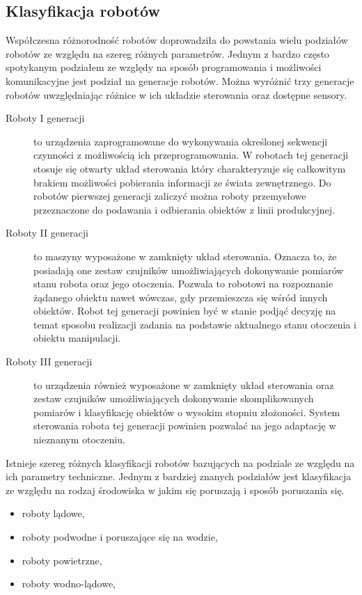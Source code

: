 \subsection{Klasyfikacja robotów}
Współczesna różnorodność robotów doprowadziła do powstania wielu podziałów
robotów ze względu na szereg różnych parametrów. Jednym z bardzo często
spotykanym podziałem ze względy na sposób programowania i możliwości
komunikacyjne jest podział na generacje robotów. Można wyróżnić trzy generacje
robotów uwzględniając różnice w ich układzie sterowania oraz dostępne sensory.
\cite{website:robotyka-pl}
\begin{description}
\item[Roboty I generacji] to urządzenia zaprogramowane do wykonywania określonej
sekwencji czynności z możliwością ich przeprogramowania. W robotach tej
generacji stosuje się otwarty układ sterowania który charakteryzuje się
całkowitym brakiem możliwości pobierania informacji ze świata zewnętrznego. Do
robotów pierwszej generacji zaliczyć można roboty przemysłowe przeznaczone do
podawania i odbierania obiektów z linii produkcyjnej.
\item[Roboty II generacji] to maszyny wyposażone w zamknięty układ sterowania.
Oznacza to, że posiadają one zestaw czujników umożliwiających dokonywanie
pomiarów stanu robota oraz jego otoczenia. Pozwala to robotowi na rozpoznanie
żądanego obiektu nawet wówczas, gdy przemieszcza się wśród innych obiektów.
Robot tej generacji powinien być w stanie podjąć decyzję na temat sposobu
realizacji zadania na podstawie aktualnego stanu otoczenia i obiektu
manipulacji.
\item[Roboty III generacji] to urządzenia również wyposażone w zamknięty układ
sterowania oraz zestaw czujników umożliwiających dokonywanie skomplikowanych
pomiarów i klasyfikację obiektów o wysokim stopniu złożoności. System sterowania
robota tej generacji powinien pozwalać na jego adaptację w nieznanym otoczeniu.
\end{description}
Istnieje szereg różnych klasyfikacji robotów bazujących na podziale ze względu
na ich parametry techniczne. Jednym z bardziej znanych podziałów jest
klasyfikacja ze względu na rodzaj środowiska w jakim się poruszają i sposób
poruszania się.
\begin{itemize}
  \item roboty lądowe,
  \item roboty podwodne i poruszające się na wodzie,
  \item roboty powietrzne,
  \item roboty wodno-lądowe,
\end{itemize}
